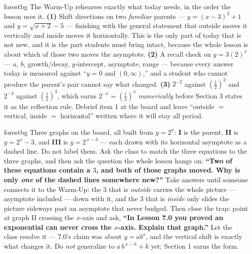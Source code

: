 \documentclass[10pt]{article}
\begin{document}
\begin{fixedskillbox}{forestbg}
    The Warm-Up rehearses exactly what today needs, in the order the lesson uses it. \textbf{(1)}
    Shift directions on two \emph{familiar} parents --- $y=(x-3)^{2}+1$ and $y=\sqrt{x+2}-5$ ---
    finishing with the general statement that outside moves it vertically and inside moves it
    horizontally. This is the only part of today that is not new, and it is the part students must
    bring intact, because the whole lesson is about which of those two moves the asymptote.
    \textbf{(2)} A recall check on $y=3(2)^{x}$ --- $a$, $b$, growth/decay, $y$-intercept, asymptote,
    range --- because every answer today is measured against ``$y=0$ and $(0,\infty)$,'' and a student
    who cannot produce the parent's pair cannot say what changed. \textbf{(3)} $2^{-2}$ against
    $\left(\frac12\right)^{2}$ and $2^{-3}$ against $\left(\frac12\right)^{3}$, which earns
    $2^{-x}=\left(\frac12\right)^{x}$ \emph{numerically} before Section 3 states it as the reflection
    rule. Debrief item 1 at the board and leave ``outside $=$ vertical, inside $=$ horizontal'' written
    where it will stay all period.
\end{fixedskillbox}

\begin{skillbox}[Hook]{forestbg}
    Three graphs on the board, all built from $y=2^{x}$: \textbf{I} is the parent, \textbf{II} is
    $y=2^{x}-3$, and \textbf{III} is $y=2^{\,x-3}$ --- each drawn with its horizontal asymptote as a
    dashed line. Do not label them. Ask the class to match the three equations to the three graphs,
    and then ask the question the whole lesson hangs on: \textbf{``Two of these equations contain a
    $3$, and both of those graphs moved. Why is only \emph{one} of the dashed lines somewhere new?''}
    Take answers until someone connects it to the Warm-Up: the $3$ that is \emph{outside} carries the
    whole picture --- asymptote included --- down with it, and the $3$ that is \emph{inside} only
    slides the picture sideways past an asymptote that never budged. Then close the trap: point at
    graph II crossing the $x$-axis and ask, \textbf{``In Lesson 7.0 you proved an exponential can
    never cross the $x$-axis. Explain that graph.''} Let the class resolve it --- 7.0's claim was
    about $y=ab^{x}$, and the vertical shift is exactly what changes it. Do \emph{not} generalize to
    $a\,b^{\,x-h}+k$ yet; Section 1 earns the form.
\end{skillbox}
\end{document}
